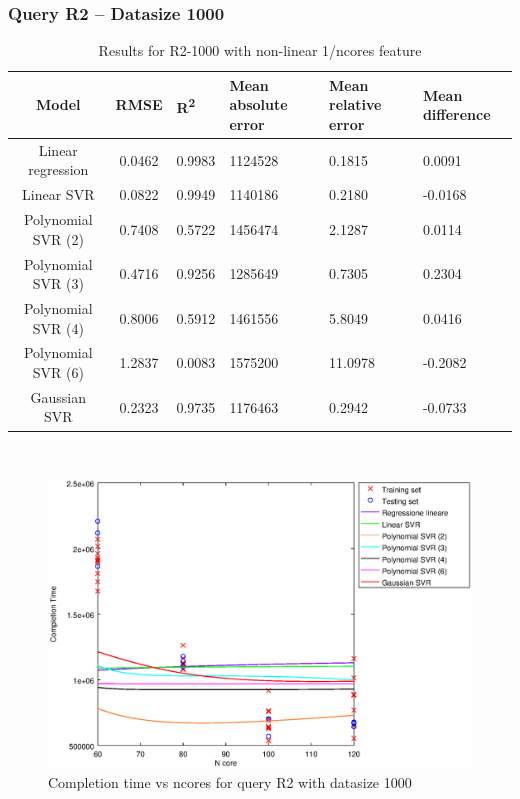 \documentclass[a4paper,11pt]{article}
\begin{document}
\newpage
\subsubsection{Query R2 -- Datasize 1000}
\begin{table}[H]
	\centering
	\begin{adjustbox}{center}
		\begin{tabular}{c | c M{1.2cm} M{2.5cm} M{2.5cm} M{1.8cm}}
			Model & RMSE & R\textsuperscript{2} & Mean absolute error & Mean relative error & Mean difference \tabularnewline
			\hline
			Linear regression & 0.0462 & 0.9983 & 1124528 & 0.1815 & 0.0091 \\
			Linear SVR & 0.0822 & 0.9949 & 1140186 & 0.2180 & -0.0168 \\
			Polynomial SVR (2) & 0.7408 & 0.5722 & 1456474 & 2.1287 & 0.0114 \\
			Polynomial SVR (3) & 0.4716 & 0.9256 & 1285649 & 0.7305 & 0.2304 \\
			Polynomial SVR (4) & 0.8006 & 0.5912 & 1461556 & 5.8049 & 0.0416 \\
			Polynomial SVR (6) & 1.2837 & 0.0083 & 1575200 & 11.0978 & -0.2082 \\
			Gaussian SVR & 0.2323 & 0.9735 & 1176463 & 0.2942 & -0.0733 \\
		\end{tabular}
	\end{adjustbox}
	\\
	\caption{Results for R2-1000 with non-linear 1/ncores feature}
	\label{table_R2_prediction_all}
\end{table}

\begin {figure}[hbtp]
\centering
\includegraphics[width=\textwidth]{output/R2_1000_1_OVER_NCORES/plot_R2_1000.eps}
\caption {Completion time vs ncores for query R2 with datasize 1000}
\end {figure}
\end{document}
